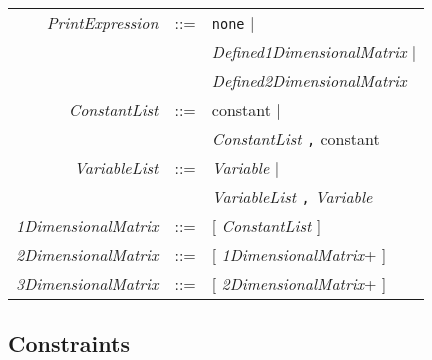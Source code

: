 \documentclass{article}
\begin{document}
\begin{small}
\begin{tabular}{rcl}
\textit{PrintExpression} & ::= & \texttt{none} $\mid$ \\
                         &     & \textit{Defined1DimensionalMatrix} $\mid$ \\
                         &     & \textit{Defined2DimensionalMatrix}  \\

\textit{ConstantList}  & ::= & constant $\mid$\\
                       &     & \textit{ConstantList} \texttt{,} constant \\     

\textit{VariableList}& ::= & \textit{Variable} $\mid$ \\   
                       &   & \textit{VariableList} \texttt{,} \textit{Variable} \\

\textit{1DimensionalMatrix} & ::= & [ \textit{ConstantList} ] \\

\textit{2DimensionalMatrix} & ::= & [ \textit{1DimensionalMatrix}+ ]\\

\textit{3DimensionalMatrix} & ::= & [ \textit{2DimensionalMatrix}+ ]\\

\end{tabular}


\subsection{Constraints}
\begin{tabular}{rcl}



\end{tabular}
\end{small}
\end{document}
